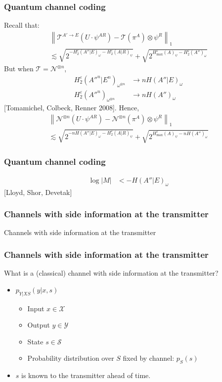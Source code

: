 \documentclass[12pt]{beamer}
\begin{document}
\begin{frame}
	\frametitle{Quantum channel coding}
	Recall that:
\begin{multline*}
 \left\| \mathcal{T}^{A' \rightarrow E}(U \cdot \psi^{AR}) - \mathcal{T}(\pi^A) \otimes \psi^R \right\|_1\\
\lesssim \sqrt{2^{-H^{\varepsilon}_2(A''|E)_{\omega} -H^{\varepsilon}_2(A|R)_{\psi}}} + \sqrt{2^{H^{\varepsilon}_{\max}(A)_{\psi} - H_2^{\varepsilon}(A'')_{\omega}}} 
\end{multline*}
But when $\mathcal{T} = \mathcal{N}^{\otimes n}$, 
\begin{align*}
H_2^{\varepsilon}({A''}^n|E^n)_{\omega^{\otimes n}} &\rightarrow nH(A''|E)_{\omega}\\
H_2^{\varepsilon}({A''}^n)_{\omega^{\otimes n}} &\rightarrow nH(A'')_{\omega}
\end{align*}
[Tomamichel, Colbeck, Renner 2008]. Hence,
\begin{multline*}
	\left\| \mathcal{N}^{\otimes n}(U \cdot \psi^{AR}) - \mathcal{N}^{\otimes n}(\pi^A) \otimes \psi^R \right\|_1\\
\lesssim \sqrt{2^{-nH(A''|E)_{\omega} -H^{\varepsilon}_2(A|R)_{\psi}}} + \sqrt{2^{H^{\varepsilon}_{\max}(A)_{\psi} - nH(A'')_{\omega}}} 
\end{multline*}
\end{frame}

\begin{frame}
	\frametitle{Quantum channel coding}
    \begin{figure}
    \scalebox{0.9}{}
    \end{figure}
    \begin{align*}
	    \log|M| &< -H(A''|E)_{\omega}
    \end{align*}
    [Lloyd, Shor, Devetak] 
\end{frame}

\begin{frame}
	\frametitle{Channels with side information at the transmitter}
	\begin{center}
	\Huge Channels with side information at the transmitter
	\end{center}
\end{frame}

\begin{frame}
	\frametitle{Channels with side information at the transmitter}
	What is a (classical) channel with side information at the transmitter?
	\begin{itemize}
		\item $p_{Y|XS}(y|x,s)$
		\begin{itemize}
			\item Input $x \in \mathcal{X}$	
			\item Output $y \in \mathcal{Y}$	
			\item State $s \in \mathcal{S}$	
			\item Probability distribution over $S$ fixed by channel: $p_S(s)$	
		\end{itemize}
	\item $s$ is known to the transmitter ahead of time.	
	\end{itemize}
\end{frame}
\end{document}
